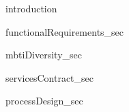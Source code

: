 {introduction}

{functionalRequirements_sec}

{mbtiDiversity_sec}

{servicesContract_sec}

{processDesign_sec}
